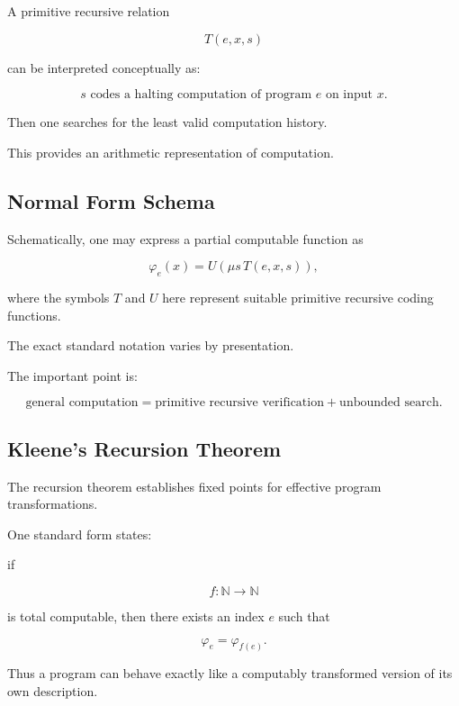 A primitive recursive relation

\[
T(e,x,s)
\]

can be interpreted conceptually as:

\[
\boxed{
s
\text{ codes a halting computation of program }e
\text{ on input }x.
}
\]

Then one searches for the least valid computation history.

This provides an arithmetic representation of computation.

\subsection{Normal Form Schema}
\label{subsec:kleene-normal-form-schema}

Schematically, one may express a partial computable function as

\[
\boxed{
\varphi_e(x)
=
U
\left(
\mu s\,
T(e,x,s)
\right),
}
\]

where the symbols \(T\) and \(U\) here represent suitable primitive
recursive coding functions.

The exact standard notation varies by presentation.

The important point is:

\[
\boxed{
\text{general computation}
=
\text{primitive recursive verification}
+
\text{unbounded search}.
}
\]

\subsection{Kleene's Recursion Theorem}
\label{subsec:kleene-recursion-theorem}

The recursion theorem establishes fixed points for effective program
transformations.

One standard form states:

if

\[
f:\mathbb{N}\to\mathbb{N}
\]

is total computable, then there exists an index \(e\) such that

\[
\boxed{
\varphi_e
=
\varphi_{f(e)}.
}
\]

Thus a program can behave exactly like a computably transformed version of
its own description.

